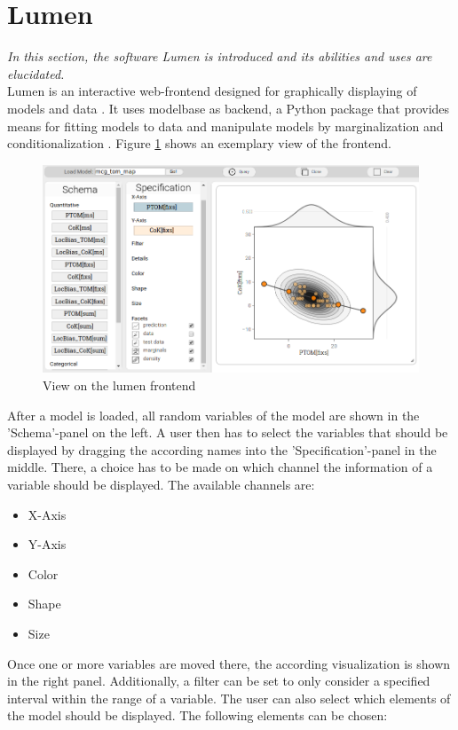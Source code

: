 \documentclass{article}
\begin{document}
\section{Lumen}
\label{sec:Lumen}
\textit{In this section, the software Lumen is introduced and its abilities and uses are elucidated.}
\\ 
Lumen is an interactive web-frontend designed for graphically displaying of models and data \cite{Lucas2016a}. It uses modelbase as backend, a Python package that provides means for fitting models to data and manipulate models by marginalization and conditionalization \cite{Lucas2016b}. Figure \ref{fig:lumen_screenshot} shows an exemplary view of the frontend.
\begin{figure}
	\includegraphics[width=\textwidth]{images/lumen_screenshot.png}
	\caption{View on the lumen frontend}
	\label{fig:lumen_screenshot}
\end{figure}
After a model is loaded, all random variables of the model are shown in the 'Schema'-panel on the left. A user then has to select the variables that should be displayed by dragging the according names into the 'Specification'-panel in the middle. There, a choice has to be made on which channel the information of a variable should be displayed. The available channels are:
\begin{itemize}
	\item X-Axis
	\item Y-Axis
	\item Color
	\item Shape
	\item Size
\end{itemize}
Once one or more variables are moved there, the according visualization is shown in the right panel. Additionally, a filter can be set to only consider a specified interval within the range of a variable. The user can also select which elements of the model should be displayed. The following elements can be chosen:
\end{document}
